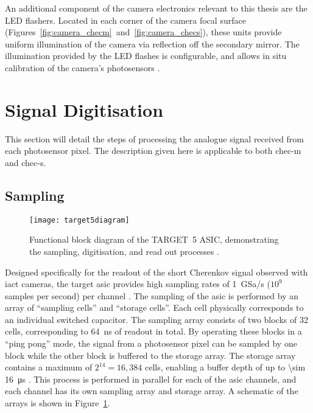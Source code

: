 An additional component of the camera electronics relevant to this thesis are the LED flashers. Located in each corner of the camera focal surface (Figures~\ref{fig:camera_checm}~and~\ref{fig:camera_checs}), these units provide uniform illumination of the camera via reflection off the secondary mirror. The illumination provided by the LED flashes is configurable, and allows in situ calibration of the camera's photosensors \cite{Brown2016a}.

\section{Signal Digitisation}

This section will detail the steps of processing the analogue signal received from each photosensor pixel. The description given here is applicable to both \gls{chec-m} and \gls{chec-s}.

\subsection{Sampling}

\begin{figure}
	\centering\texttt{[image: target5diagram]} 
	\caption[Functional block diagram of the TARGET~5 ASIC.]{Functional block diagram of the TARGET~5 ASIC, demonstrating the sampling, digitisation, and read out processes \cite{Albert2017}.}
	\label{fig:target5diagram}
\end{figure}

Designed specifically for the readout of the short Cherenkov signal observed with \gls{iact} cameras, the \gls{target} \gls{asic} provides high sampling rates of \SI{1}{GSa/s} ($10^9$ samples per second) per channel \cite{Funk2017}. The sampling of the \gls{asic} is performed by an array of ``sampling cells'' and ``storage cells''. Each cell physically corresponds to an individual switched capacitor. The sampling array consists of two blocks of 32 cells, corresponding to \SI{64}{ns} of readout in total. By operating these blocks in a ``ping pong'' mode, the signal from a photosensor pixel can be sampled by one block while the other block is buffered to the storage array. The storage array contains a maximum of $2^{14} = 16,384$ cells, enabling a buffer depth of up to \SI{\sim 16}{\micro s} \cite{Funk2017}. This process is performed in parallel for each of the \gls{asic} channels, and each channel has its own sampling array and storage array. A schematic of the arrays is shown in Figure~\ref{fig:target5diagram}.

